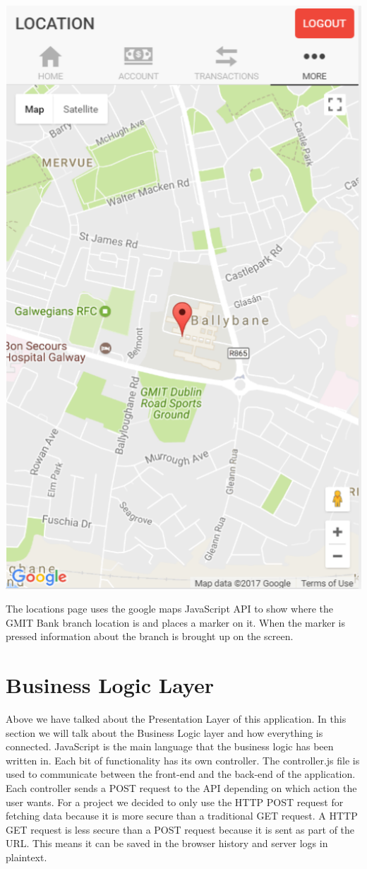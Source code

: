 \begin{center}    
    \includegraphics[scale=0.5]{img/Locations.png}
\end{center}
The locations page uses the google maps JavaScript API to show where the GMIT Bank branch location is and places a marker on it. When the marker is pressed information about the branch is brought up on the screen.
 

\section{Business Logic Layer}
Above we have talked about the Presentation Layer of this application. In this section we will talk about the Business Logic layer and how everything is connected. JavaScript is the main language that the business logic has been written in. Each bit of functionality has its own controller. The controller.js file is used to communicate between the front-end and the back-end of the application.  Each controller sends a POST request to the API depending on which action the user wants. For a project we decided to only use the HTTP POST request for fetching data because it is more secure than a traditional GET request. A HTTP GET request is less secure than a POST request because it is sent as part of the URL. This means it can be saved in the browser history and server logs in plaintext.\cite{http}

